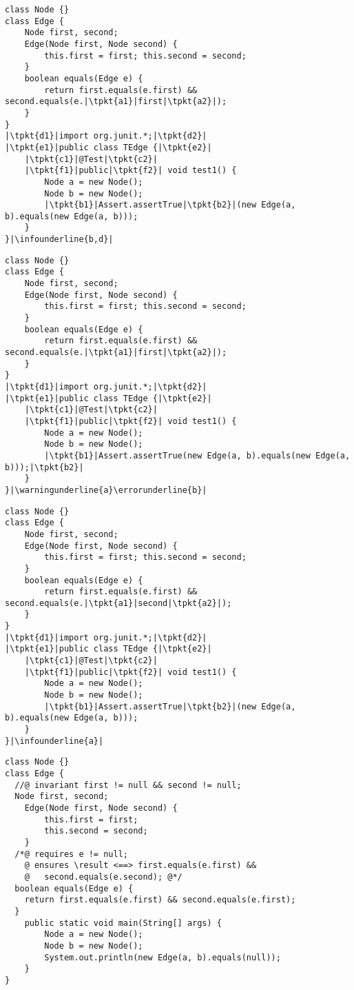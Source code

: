 \newsavebox{\codefour}
\begin{lrbox}{\codefour}
\begin{lstlisting}
class Node {}
class Edge {
	Node first, second;
	Edge(Node first, Node second) {
		this.first = first; this.second = second;
	}
	boolean equals(Edge e) {
	    return first.equals(e.first) && second.equals(e.|\tpkt{a1}|first|\tpkt{a2}|);
	}
}
|\tpkt{d1}|import org.junit.*;|\tpkt{d2}|
|\tpkt{e1}|public class TEdge {|\tpkt{e2}|
	|\tpkt{c1}|@Test|\tpkt{c2}|
	|\tpkt{f1}|public|\tpkt{f2}| void test1() {
		Node a = new Node();
		Node b = new Node();
		|\tpkt{b1}|Assert.assertTrue|\tpkt{b2}|(new Edge(a, b).equals(new Edge(a, b)));
	}
}|\infounderline{b,d}|
\end{lstlisting}
\end{lrbox}

\newsavebox{\bugfour}
\begin{lrbox}{\bugfour}
	\begin{lstlisting}
class Node {}
class Edge {
	Node first, second;
	Edge(Node first, Node second) {
		this.first = first; this.second = second;
	}
	boolean equals(Edge e) {
		return first.equals(e.first) && second.equals(e.|\tpkt{a1}|first|\tpkt{a2}|);
	}
}
|\tpkt{d1}|import org.junit.*;|\tpkt{d2}|
|\tpkt{e1}|public class TEdge {|\tpkt{e2}|
	|\tpkt{c1}|@Test|\tpkt{c2}|
	|\tpkt{f1}|public|\tpkt{f2}| void test1() {
		Node a = new Node();
		Node b = new Node();
		|\tpkt{b1}|Assert.assertTrue(new Edge(a, b).equals(new Edge(a, b)));|\tpkt{b2}|
	}
}|\warningunderline{a}\errorunderline{b}|
	\end{lstlisting}
\end{lrbox}

\newsavebox{\codefive}
\begin{lrbox}{\codefive}
	\begin{lstlisting}
class Node {}
class Edge {
	Node first, second;
	Edge(Node first, Node second) {
		this.first = first; this.second = second;
	}
	boolean equals(Edge e) {
		return first.equals(e.first) && second.equals(e.|\tpkt{a1}|second|\tpkt{a2}|);
	}
}
|\tpkt{d1}|import org.junit.*;|\tpkt{d2}|
|\tpkt{e1}|public class TEdge {|\tpkt{e2}|
	|\tpkt{c1}|@Test|\tpkt{c2}|
	|\tpkt{f1}|public|\tpkt{f2}| void test1() {
		Node a = new Node();
		Node b = new Node();
		|\tpkt{b1}|Assert.assertTrue|\tpkt{b2}|(new Edge(a, b).equals(new Edge(a, b)));
	}
}|\infounderline{a}|
	\end{lstlisting}
\end{lrbox}

\newsavebox{\dbc}
\begin{lrbox}{\dbc}
\begin{lstlisting}
class Node {}
class Edge {
  //@ invariant first != null && second != null;
  Node first, second;
	Edge(Node first, Node second) {
		this.first = first;
		this.second = second;
	}
  /*@ requires e != null;
    @ ensures \result <==> first.equals(e.first) &&
    @   second.equals(e.second); @*/
  boolean equals(Edge e) {
    return first.equals(e.first) && second.equals(e.first);
  }
	public static void main(String[] args) {
		Node a = new Node();
		Node b = new Node();
		System.out.println(new Edge(a, b).equals(null));
	}
}
\end{lstlisting}
\end{lrbox}

